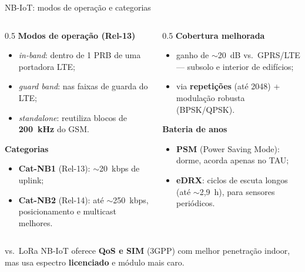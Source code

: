 \documentclass[aspectratio=169,11pt]{beamer}
\begin{document}
\begin{frame}{NB-IoT: modos de operação e categorias}
  \begin{columns}
    \begin{column}{0.5\textwidth}
      \textbf{Modos de operação (Rel-13)}
      \begin{itemize}
        \item \emph{in-band}: dentro de 1 PRB de uma portadora LTE;
        \item \emph{guard band}: nas faixas de guarda do LTE;
        \item \emph{standalone}: reutiliza blocos de \textbf{200~kHz} do GSM.
      \end{itemize}
      \textbf{Categorias}
      \begin{itemize}
        \item \textbf{Cat-NB1} (Rel-13): $\sim$20~kbps de uplink;
        \item \textbf{Cat-NB2} (Rel-14): até $\sim$250~kbps, posicionamento e multicast melhores.
      \end{itemize}
    \end{column}
    \begin{column}{0.5\textwidth}
      \textbf{Cobertura melhorada}
      \begin{itemize}
        \item ganho de $\sim$20~dB vs.\ GPRS/LTE --- subsolo e interior de edifícios;
        \item via \textbf{repetições} (até 2048) + modulação robusta (BPSK/QPSK).
      \end{itemize}
      \textbf{Bateria de anos}
      \begin{itemize}
        \item \textbf{PSM} (Power Saving Mode): dorme, acorda apenas no TAU;
        \item \textbf{eDRX}: ciclos de escuta longos (até $\sim$2,9~h), para sensores periódicos.
      \end{itemize}
    \end{column}
  \end{columns}
  \begin{exampleblock}{vs.\ LoRa}
    NB-IoT oferece \textbf{QoS e SIM} (3GPP) com melhor penetração indoor, mas usa espectro \textbf{licenciado} e módulo mais caro.
  \end{exampleblock}
\end{frame}
\end{document}

